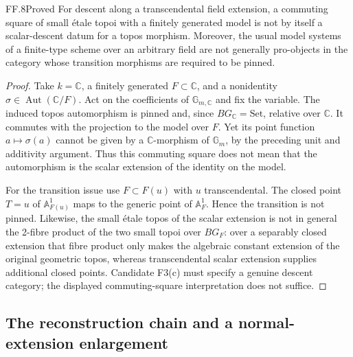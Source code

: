 \begin{claim}{FF.8}{Proved}\label{clm:FF8}
For descent along a transcendental field extension, a commuting
square of small \'etale topoi with a finitely generated model is
not by itself a scalar-descent datum for a topos morphism.
Moreover, the usual model systems of a finite-type scheme over
an arbitrary field are not generally pro-objects in the category
whose transition morphisms are required to be pinned.
\end{claim}
\begin{proof}
Take \(k=\mathbb C\), a finitely generated \(F\subset\mathbb C\),
and a nonidentity \(\sigma\in\operatorname{Aut}(\mathbb C/F)\).
Act on the coefficients of \(\mathbb G_{m,\mathbb C}\) and fix
the variable. The induced topos automorphism is pinned and, since
\(BG_{\mathbb C}=\mathrm{Set}\), relative over \(\mathbb C\).
It commutes with the projection to the model over \(F\). Yet its
point function \(a\mapsto\sigma(a)\) cannot be given by a
\(\mathbb C\)-morphism of \(\mathbb G_m\), by the preceding
unit and additivity argument. Thus this commuting square does not
mean that the automorphism is the scalar extension of the identity
on the model.

For the transition issue use \(F\subset F(u)\) with \(u\)
transcendental. The closed point \(T=u\) of
\(\mathbb A^1_{F(u)}\) maps to the generic point of
\(\mathbb A^1_F\). Hence the transition is not pinned.
Likewise, the small \'etale topos of the scalar extension is
not in general the 2-fibre product of the two small topoi over
\(BG_F\): over a separably closed extension that fibre product
only makes the algebraic constant extension of the original
geometric topos, whereas transcendental scalar extension supplies
additional closed points. Candidate F3(c) must specify a genuine
descent category; the displayed commuting-square interpretation
does not suffice.
\end{proof}

\subsection{The reconstruction chain and a normal-extension enlargement}

